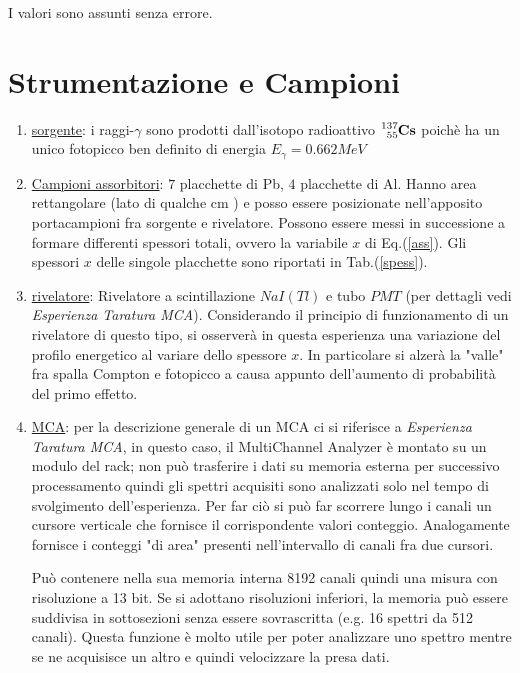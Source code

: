 \documentclass[12pt,a4paper,openright,twoside]{article}
\numberwithin{equation}{section} %
\begin{document}
I valori sono assunti senza errore.


\section{Strumentazione e Campioni}

\begin{enumerate}
\item \underline{sorgente}: i raggi-$\gamma$ sono prodotti dall'isotopo radioattivo $\ce{^{137}_{55}\mathbf{Cs}}$ poichè ha un unico fotopicco ben definito di energia $E_{\gamma}=0.662 MeV$
\item \underline{Campioni assorbitori}: $7$ placchette di Pb, $4$ placchette di Al. Hanno area rettangolare (lato di qualche cm ) e posso essere posizionate nell'apposito portacampioni fra sorgente e rivelatore.
Possono essere messi in successione a formare differenti spessori totali, ovvero la variabile $x$ di Eq.(\ref{ass}).
Gli spessori $x$ delle singole placchette sono riportati in Tab.(\ref{spess}).
\item \underline{rivelatore}: Rivelatore a scintillazione $NaI(Tl)$ e tubo $PMT$ (per dettagli vedi \textit{Esperienza Taratura MCA}). Considerando il principio di funzionamento di un rivelatore di questo tipo, si osserverà in questa esperienza una variazione del profilo energetico al variare dello spessore $x$. In particolare si alzerà la "valle" fra spalla Compton e fotopicco a causa appunto dell'aumento di probabilità del primo effetto.

\item \underline{MCA}: per la descrizione generale di un MCA ci si riferisce a \textit{Esperienza Taratura MCA}, in questo caso, il MultiChannel Analyzer è montato su un modulo del rack; non può trasferire i dati su memoria esterna per successivo processamento quindi gli spettri acquisiti sono analizzati solo nel tempo di svolgimento dell'esperienza. Per far ciò si può far scorrere lungo i canali un cursore verticale che fornisce il corrispondente valori conteggio. Analogamente fornisce i conteggi "di area" presenti nell'intervallo di canali fra due cursori.

Può contenere nella sua memoria interna 8192 canali quindi una misura con risoluzione a 13 bit. Se si adottano risoluzioni inferiori, la memoria può essere suddivisa in sottosezioni senza essere sovrascritta (e.g. 16 spettri da 512 canali). Questa funzione è molto utile per poter analizzare uno spettro mentre se ne acquisisce un altro e quindi velocizzare la presa dati.


\end{enumerate}
\end{document}

